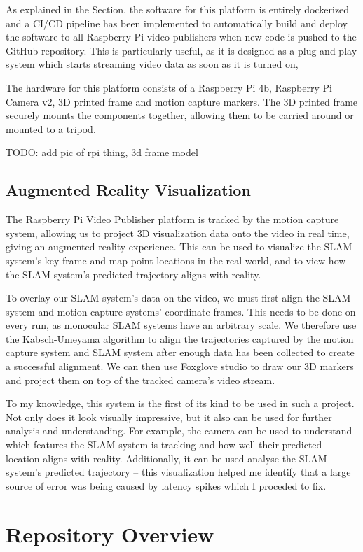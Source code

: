 As explained in the  Section, the software for this platform is entirely dockerized and a CI/CD pipeline has been implemented to automatically build and deploy the software to all Raspberry Pi video publishers when new code is pushed to the GitHub repository. This is particularly useful, as it is designed as a plug-and-play system which starts streaming video data as soon as it is turned on,

The hardware for this platform consists of a Raspberry Pi 4b, Raspberry Pi Camera v2, 3D printed frame and motion capture markers. The 3D printed frame securely mounts the components together, allowing them to be carried around or mounted to a tripod.

TODO: add pic of rpi thing, 3d frame model

\subsection{Augmented Reality Visualization}
\label{sec:augmented-reality-visualization}
The Raspberry Pi Video Publisher platform is tracked by the motion capture system, allowing us to project 3D visualization data onto the video in real time, giving an augmented reality experience. This can be used to visualize the SLAM system's key frame and map point locations in the real world, and to view how the SLAM system's predicted trajectory aligns with reality.

To overlay our SLAM system's data on the video, we must first align the SLAM system and motion capture systems' coordinate frames. This needs to be done on every run, as monocular SLAM systems have an arbitrary scale. We therefore use the \hyperref[sec:kabsch-umeyama-algorithm]{Kabsch-Umeyama algorithm} to align the trajectories captured by the motion capture system and SLAM system after enough data has been collected to create a successful alignment. We can then use Foxglove studio to draw our 3D markers and project them on top of the tracked camera's video stream.

To my knowledge, this system is the first of its kind to be used in such a project. Not only does it look visually impressive, but it also can be used for further analysis and understanding. For example, the camera can be used to understand which features the SLAM system is tracking and how well their predicted location aligns with reality. Additionally, it can be used analyse the SLAM system's predicted trajectory – this visualization helped me identify that a large source of error was being caused by latency spikes which I proceded to fix.

\section{Repository Overview}
\label{sec:repository-overview}





